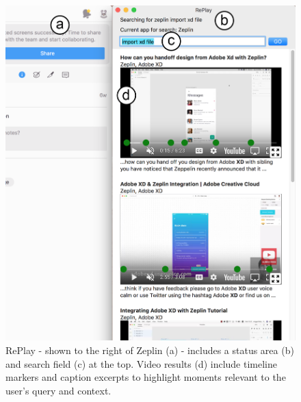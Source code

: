 \begin{figure}[t!]
\centering
  \includegraphics[width=1\textwidth]{replay/figures/replay-interface.png}
  \caption{RePlay - shown to the right of Zeplin (a) - includes a status area (b) and search field (c) at the top. Video results (d) include timeline markers and caption excerpts to highlight moments relevant to the user's query and context.}
  \label{fig:replay-interface}
  \vspace{-0.20in}
\end{figure}









